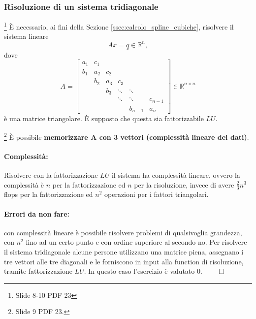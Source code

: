 \subsubsection{Risoluzione di un sistema tridiagonale}\label{ssec:risoluzione_sistema_tridiagonale}
\footnote{Slide 8-10 PDF 23} È necessario, ai fini della Sezione \ref{ssec:calcolo_spline_cubiche}, risolvere il sistema lineare
\begin{equation}\label{eq:tridia}
	A\underline{x}=\underline{q}\in\mathbb{R}^n,
\end{equation}
dove
\begin{equation*}
	A=
	\begin{bmatrix}
		a_1 & c_1 & & & &\\
		b_1 & a_2 & c_2 & & &\\
		& b_2 & a_3 & c_3 & &\\
		& & b_3 &\ddots & \ddots &\\
		& & & \ddots & \ddots & c_{n-1}\\
		& & & &  b_{n-1} & a_n
	\end{bmatrix}
	\in\mathbb{R}^{n\times n}
\end{equation*}
è una matrice triangolare. È supposto che questa sia fattorizzabile $LU$.

\begin{remark}\footnote{Slide 9 PDF 23.}
	È possibile \textbf{memorizzare $\boldsymbol A$ con 3 vettori (complessità lineare dei dati)}.
\end{remark}

\paragraph{Complessità:} Risolvere con la fattorizzazione $LU$ il sistema ha complessità lineare, ovvero la complessità è $n$ per la fattorizzazione ed $n$ per la risoluzione, invece di avere $\frac{2}{3}n^3$ flops per la fattorizzazione ed $n^2$ operazioni per i fattori triangolari. 

\paragraph{Errori da non fare:} con complessità lineare è possibile risolvere problemi di qualsivoglia grandezza, con $n^2$ fino ad un certo punto e con ordine superiore al secondo no. Per risolvere il sistema tridiagonale alcune persone utilizzano una matrice piena, assegnano i tre vettori alle tre diagonali e le forniscono in input alla function di risoluzione, tramite fattorizzazione $LU$. In questo caso l'esercizio è valutato 0. $\qed$

